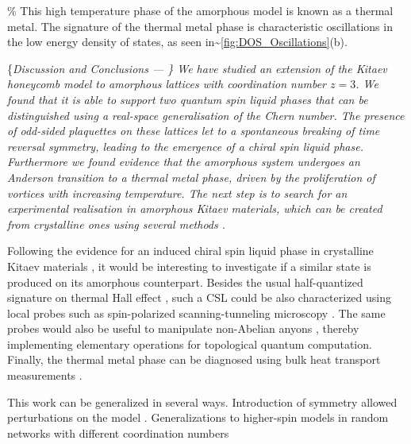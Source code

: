 \par

\% This high temperature phase of the amorphous model is known as a
thermal metal. The signature of the thermal metal phase is
characteristic oscillations in the low energy density of states, as seen
in\textasciitilde{}\cref{fig:DOS_Oscillations}(b).

\{\it Discussion and Conclusions --- \} We have studied an extension of
the Kitaev honeycomb model to amorphous lattices with coordination
number \(z= 3\). We found that it is able to support two quantum spin
liquid phases that can be distinguished using a real-space
generalisation of the Chern number. The presence of odd-sided plaquettes
on these lattices let to a spontaneous breaking of time reversal
symmetry, leading to the emergence of a chiral spin liquid phase.
Furthermore we found evidence that the amorphous system undergoes an
Anderson transition to a thermal metal phase, driven by the
proliferation of vortices with increasing temperature. The next step is
to search for an experimental realisation in amorphous Kitaev materials,
which can be created from crystalline ones using several methods
\cite{Weaire1976,Petrakovski1981,Kaneyoshi2018}.

\par

Following the evidence for an induced chiral spin liquid phase in
crystalline Kitaev materials
\cite{Kasahara2018,Yokoi2021,Yamashita2020,Bruin2022}, it would be
interesting to investigate if a similar state is produced on its
amorphous counterpart. Besides the usual half-quantized signature on
thermal Hall effect
\cite{Kasahara2018,Yokoi2021,Yamashita2020,Bruin2022}, such a CSL could
be also characterized using local probes such as spin-polarized
scanning-tunneling microscopy
\cite{Feldmeier2020,Konig2020,Udagawa2021}. The same probes would also
be useful to manipulate non-Abelian anyons \cite{Pereira2020}, thereby
implementing elementary operations for topological quantum computation.
Finally, the thermal metal phase can be diagnosed using bulk heat
transport measurements \cite{Beenakker2013}.

\par

This work can be generalized in several ways. Introduction of symmetry
allowed perturbations on the model
\cite{Rau2014,Chaloupka2010,Chaloupka2013,Chaloupka2015,Winter2016}.
Generalizations to higher-spin models in random networks with different
coordination numbers
\cite{Baskaran2008,Yao2009,Nussinov2009,Yao2011,Chua2011,Natori2020,Chulliparambil2020,Chulliparambil2021,Seifert2020,WangHaoranPRB2021,Wu2009}

